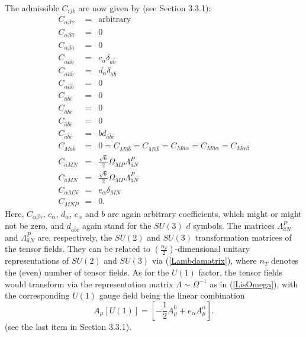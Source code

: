 \documentclass[a4paper,11pt]{article}
\newcommand{\nn}{\nonumber}
\begin{document}
The admissible $C_{ijk}$ are now given by (see Section 3.3.1):
\begin{eqnarray}
C_{\alpha\beta\gamma}&=&\textrm{arbitrary} \nn \\
C_{\alpha\beta\hat{a}}&=&0 \nn \\
C_{\alpha\beta\bar{a}}&=&0 \nn \\
C_{\alpha \hat{a}\hat{b}}&=&c_{\alpha}\delta_{\hat{a}\hat{b}} \nn \\
C_{\alpha \bar{a}\bar{b}}&=&d_{\alpha}\delta_{\bar{a}\bar{b}} \nn \\
C_{\alpha \hat{a}\bar{b}}&=&0 \nn \\
C_{ \hat{a} \hat{b} \hat{c}}&=&0 \nn \\
C_{ \hat{a} \hat{b} \bar{c}}&=&0 \nn \\
C_{ \hat{a} \bar{b} \bar{c}}&=&0  \\
C_{ \bar{a} \bar{b} \bar{c}}&=&b d_{\bar{a} \bar{b} \bar{c}} \nn \\
C_{M\bar{a}\bar{b}}&=&0=C_{M\hat{a}\hat{b}}=C_{M\bar{a}\hat{b}}
=C_{M\bar{a}\alpha}=C_{M\hat{a}\alpha}=C_{M\alpha\beta} \nn \\
C_{\hat{a}MN}&=&\frac{\sqrt{6}}{2}\Omega_{MP}\Lambda_{\hat{a}N}^{P} \nn \\
C_{\bar{a}MN}&=&\frac{\sqrt{6}}{2}\Omega_{MP}\Lambda_{\bar{a}N}^{P} \nn \\
C_{\alpha MN}&=& e_{\alpha}\delta_{MN} \nn \\
C_{MNP}&=&0 \nn .
\end{eqnarray}
Here, $C_{\alpha\beta\gamma}$, $c_{\alpha}$, $d_{\alpha}$, $e_{\alpha}$ and 
$b$
are again arbitrary coefficients, which might or might not be zero,
and $d_{\bar{a} \bar{b} \bar{c}}$ again stand for the $SU(3)$ $d$ symbols.
The matrices $\Lambda_{\hat{a}N}^{P}$ and $\Lambda_{\bar{a}N}^{P}$
are, respectively,
the $SU(2)$ and $SU(3)$ transformation matrices of the tensor fields.
They can be related  to $\left(\frac{n_T}{2}\right)$-dimensional 
unitary representations of $SU(2)$ 
and $SU(3)$ via (\ref{Lambdamatrix}), where $n_T$ denotes the (even)
number of tensor fields. As for the $U(1)$ factor, the tensor fields 
would transform 
via the representation matrix $\Lambda\sim \Omega^{-1}$ as in 
(\ref{LisOmega}),
with the corresponding $U(1)$ gauge field being the linear combination
\begin{displaymath}
A_{\mu}[U(1)]=\left[-\frac{1}{2}A_{\mu}^{0}+e_{\alpha}
        A_{\mu}^{\alpha}\right].
\end{displaymath}
(see the last item in Section 3.3.1).
\end{document}
